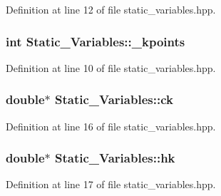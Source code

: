 Definition at line 12 of file static\+\_\+variables.\+hpp.

\subsubsection[{\texorpdfstring{\+\_\+kpoints}{_kpoints}}]{\setlength{\rightskip}{0pt plus 5cm}int Static\+\_\+\+Variables\+::\+\_\+kpoints\hspace{0.3cm}{\ttfamily [protected]}}\hypertarget{class_static___variables_a54375c70778d68a29c53027321740c46}{}\label{class_static___variables_a54375c70778d68a29c53027321740c46}


Definition at line 10 of file static\+\_\+variables.\+hpp.

\subsubsection[{\texorpdfstring{ck}{ck}}]{\setlength{\rightskip}{0pt plus 5cm}double$\ast$ Static\+\_\+\+Variables\+::ck\hspace{0.3cm}{\ttfamily [protected]}}\hypertarget{class_static___variables_a8089de2fe7aea3bd87fabf8aeb742aa3}{}\label{class_static___variables_a8089de2fe7aea3bd87fabf8aeb742aa3}


Definition at line 16 of file static\+\_\+variables.\+hpp.

\subsubsection[{\texorpdfstring{hk}{hk}}]{\setlength{\rightskip}{0pt plus 5cm}double$\ast$ Static\+\_\+\+Variables\+::hk\hspace{0.3cm}{\ttfamily [protected]}}\hypertarget{class_static___variables_a7c5b44c376044644342b1f47a9a91c8d}{}\label{class_static___variables_a7c5b44c376044644342b1f47a9a91c8d}


Definition at line 17 of file static\+\_\+variables.\+hpp.

